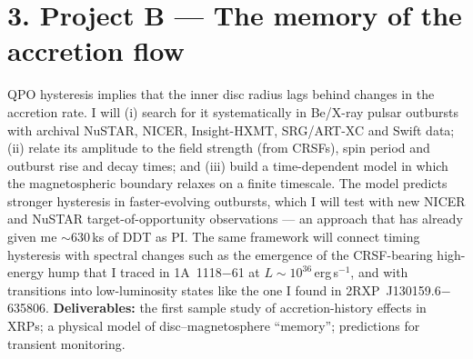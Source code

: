 \documentclass[11pt]{article}
\begin{document}
\section*{3. Project B --- The memory of the accretion flow}
QPO hysteresis implies that the inner disc radius lags behind changes in the accretion
rate. I will (i) search for it systematically in Be/X-ray pulsar outbursts with archival
NuSTAR, NICER, Insight-HXMT, SRG/ART-XC and Swift data; (ii) relate its amplitude to the
field strength (from CRSFs), spin period and outburst rise and decay times; and (iii)
build a time-dependent model in which the magnetospheric boundary relaxes on a finite
timescale. The model predicts stronger hysteresis in faster-evolving outbursts, which I
will test with new NICER and NuSTAR target-of-opportunity observations --- an approach
that has already given me $\sim$630\,ks of DDT as PI. The same framework will connect
timing hysteresis with spectral changes such as the emergence of the CRSF-bearing
high-energy hump that I traced in 1A~1118$-$61 at $L\sim10^{36}$\,erg\,s$^{-1}$, and with
transitions into low-luminosity states like the one I found in 2RXP~J130159.6$-$635806.
\textbf{Deliverables:} the first sample study of accretion-history effects in XRPs; a
physical model of disc--magnetosphere ``memory''; predictions for transient monitoring.
\end{document}

